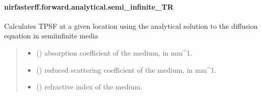 \documentclass[letterpaper,10pt,english]{sphinxmanual}
\begin{document}
\sphinxstepscope


\paragraph{nirfasterff.forward.analytical.semi\_infinite\_TR}
\label{\detokenize{_autosummary/nirfasterff.forward.analytical.semi_infinite_TR:nirfasterff-forward-analytical-semi-infinite-tr}}\label{\detokenize{_autosummary/nirfasterff.forward.analytical.semi_infinite_TR::doc}}

\begin{fulllineitems}
\label{\detokenize{_autosummary/nirfasterff.forward.analytical.semi_infinite_TR:nirfasterff.forward.analytical.semi_infinite_TR}}
\pysigstartsignatures
{}
\pysigstopsignatures
\sphinxAtStartPar
Calculates TPSF at a given location using the analytical solution to the diffusion equation in semi\sphinxhyphen{}infinite media
\begin{quote}\begin{description}
\begin{itemize}
\item {} 
\sphinxAtStartPar
{} () \textendash{} absorption coefficient of the medium, in mm\textasciicircum{}\sphinxhyphen{}1.

\item {} 
\sphinxAtStartPar
{} () \textendash{} reduced scattering coefficient of the medium, in mm\textasciicircum{}\sphinxhyphen{}1.

\item {} 
\sphinxAtStartPar
{} () \textendash{} refractive index of the medium.


\end{itemize}
\end{description}
\end{quote}
\end{fulllineitems}
\end{document}
